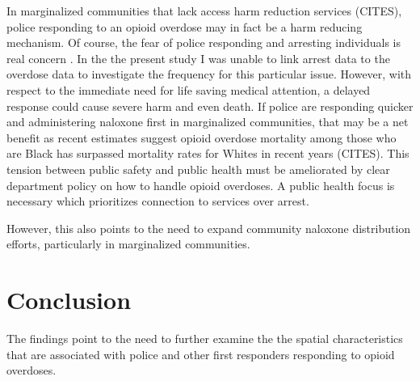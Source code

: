 In marginalized communities that lack access harm reduction services (CITES), police responding to an opioid overdose may in fact be a harm reducing mechanism. Of course, the fear of police responding and arresting individuals is real concern \parencite{bohnert_policing_2011, van_der_meulen_thats_2021}. In the the present study I was unable to link arrest data to the overdose data to investigate the frequency for this particular issue. However, with respect to the immediate need for life saving medical attention, a delayed response could cause severe harm and even death. If police are responding quicker and administering naloxone first in marginalized communities, that may be a net benefit as recent estimates suggest opioid overdose mortality among those who are Black has surpassed mortality rates for Whites in recent years (CITES). This tension between public safety and public health must be ameliorated by clear department policy on how to handle opioid overdoses. A public health focus is necessary which prioritizes connection to services over arrest.

However, this also points to the need to expand community naloxone distribution efforts, particularly in marginalized communities.  

\section{\centering Conclusion}

The findings point to the need to further examine the the spatial characteristics that are associated with police and other first responders responding to opioid overdoses.

\newpage





